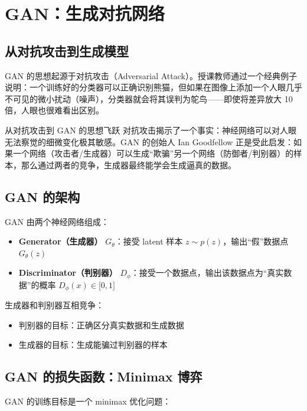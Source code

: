 \section{GAN：生成对抗网络}

\subsection{从对抗攻击到生成模型}

GAN 的思想起源于对抗攻击（Adversarial Attack）。授课教师通过一个经典例子说明：一个训练好的分类器可以正确识别熊猫，但如果在图像上添加一个人眼几乎不可见的微小扰动（噪声），分类器就会将其误判为鸵鸟——即使将差异放大 10 倍，人眼也很难看出区别。

\begin{knowledgebox}{从对抗攻击到 GAN 的思想飞跃}
对抗攻击揭示了一个事实：神经网络可以对人眼无法察觉的细微变化极其敏感。GAN 的创始人 Ian Goodfellow 正是受此启发：如果一个网络（攻击者/生成器）可以生成``欺骗''另一个网络（防御者/判别器）的样本，那么通过两者的竞争，生成器最终能学会生成逼真的数据。
\end{knowledgebox}

\subsection{GAN 的架构}

GAN 由两个神经网络组成：

\begin{itemize}
    \item \textbf{Generator（生成器）} $G_\theta$：接受 latent 样本 $z \sim p(z)$，输出``假''数据点 $G_\theta(z)$
    \item \textbf{Discriminator（判别器）} $D_\phi$：接受一个数据点，输出该数据点为``真实数据''的概率 $D_\phi(x) \in {[}0, 1{]}$
\end{itemize}

生成器和判别器互相竞争：
\begin{itemize}
    \item 判别器的目标：正确区分真实数据和生成数据
    \item 生成器的目标：生成能骗过判别器的样本
\end{itemize}

\subsection{GAN 的损失函数：Minimax 博弈}

GAN 的训练目标是一个 minimax 优化问题：

